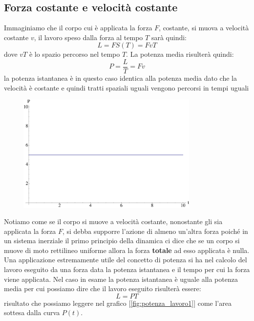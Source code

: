 \documentclass[a4paper,10pt,oneside]{article}
\begin{document}
\subsection*{Forza costante e velocità costante}
Immaginiamo che il corpo cui è applicata la forza $F$, costante, si muova a velocità costante $v$, il lavoro speso dalla forza al tempo $T$ sarà quindi:
\begin{equation}
 L=FS(T)=FvT
\end{equation}
dove $vT$ è lo spazio percorso nel tempo $T$.
La potenza media risulterà quindi:
\begin{equation}\label{p_ist}
 P=\frac{L}{T}=Fv
\end{equation}
la potenza istantanea è in questo caso identica alla potenza media dato che la velocità è costante e quindi  tratti spaziali uguali vengono percorsi in tempi uguali
\begin{figure}[H]
 \centering
 \includegraphics[width=0.8\textwidth]{./immagini/potenza_costante.pdf}
 \label{fig:potenza_costante}
\end{figure}
Notiamo come se il corpo si muove a velocità costante, nonostante gli sia applicata la forza $F$, si debba  supporre l'azione di almeno un'altra forza poiché  in un sistema inerziale il primo principio della dinamica ci dice che se un corpo si muove di moto rettilineo uniforme allora la forza \textbf{totale} ad esso applicata è nulla.
Una applicazione estremamente utile del concetto di potenza si ha nel calcolo del lavoro eseguito da una forza data la potenza istantanea e il tempo per cui la forza viene applicata.
Nel caso in esame la potenza istantanea è uguale alla potenza media per cui possiamo dire che il lavoro eseguito risulterà essere:
\begin{equation}
 L=PT
\end{equation}
risultato che possiamo leggere nel grafico [\ref{fig:potenza_lavoro1}] come l'area sottesa dalla curva $P(t)$.
\end{document}
